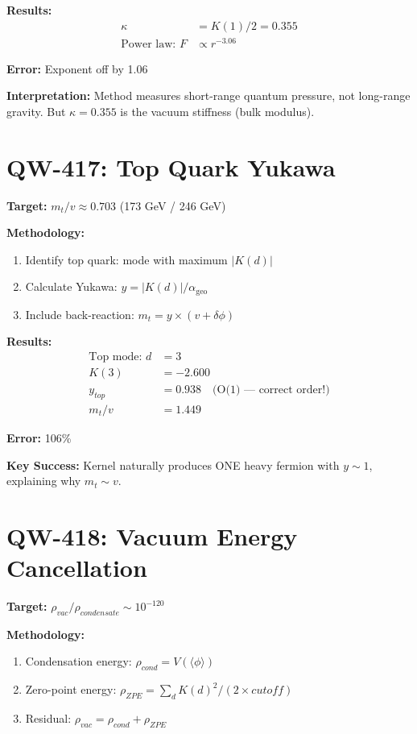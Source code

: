 \documentclass[11pt,a4paper]{book}
\theoremstyle{remark}
\newcommand{\alphageo}{\alpha_{\text{geo}}}
\begin{document}
\textbf{Results:}
\begin{align}
\kappa &= K(1)/2 = \mathbf{0.355} \\
\text{Power law: } F &\propto r^{-3.06}
\end{align}

\textbf{Error:} Exponent off by 1.06

\textbf{Interpretation:} Method measures short-range quantum pressure, not long-range gravity. But $\kappa = 0.355$ is the vacuum stiffness (bulk modulus).

\section{QW-417: Top Quark Yukawa}

\textbf{Target:} $m_t/v \approx 0.703$ (173 GeV / 246 GeV)

\textbf{Methodology:}
\begin{enumerate}
    \item Identify top quark: mode with maximum $|K(d)|$
    \item Calculate Yukawa: $y = |K(d)|/\alphageo$
    \item Include back-reaction: $m_t = y \times (v + \delta\phi)$
\end{enumerate}

\textbf{Results:}
\begin{align}
\text{Top mode: } d &= 3 \\
K(3) &= -2.600 \\
y_{top} &= \mathbf{0.938} \quad \text{(O(1) --- correct order!)} \\
m_t/v &= 1.449
\end{align}

\textbf{Error:} 106\%

\textbf{Key Success:} Kernel naturally produces ONE heavy fermion with $y \sim 1$, explaining why $m_t \sim v$.

\section{QW-418: Vacuum Energy Cancellation}

\textbf{Target:} $\rho_{vac}/\rho_{condensate} \sim 10^{-120}$

\textbf{Methodology:}
\begin{enumerate}
    \item Condensation energy: $\rho_{cond} = V(\langle\phi\rangle)$
    \item Zero-point energy: $\rho_{ZPE} = \sum_d K(d)^2 / (2 \times cutoff)$
    \item Residual: $\rho_{vac} = \rho_{cond} + \rho_{ZPE}$
\end{enumerate}
\end{document}
